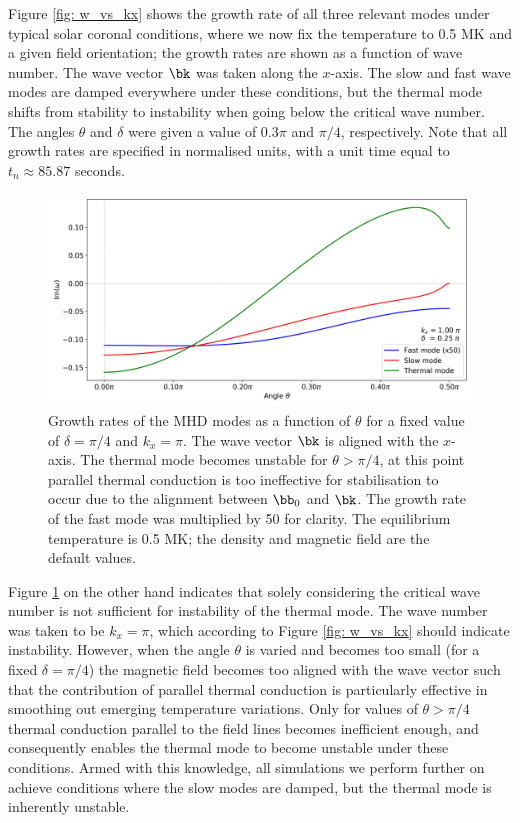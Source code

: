 Figure \ref{fig: w_vs_kx} shows the growth rate of all three relevant modes under typical solar coronal conditions, where we now fix the temperature to 0.5 MK and a given field orientation; the growth rates are shown as a function of wave number. The wave vector $\bk$ was taken along the $x$-axis. The slow and fast wave modes are damped everywhere under these conditions, but the thermal mode shifts from stability to instability when going below the critical wave number. The angles $\theta$ and $\delta$ were given a value of $0.3\pi$ and $\pi/4$, respectively. Note that all growth rates are specified in normalised units, with a unit time equal to $t_n \approx 85.87$ seconds.

\begin{figure}[t]
  \centering
  \includegraphics[width=\textwidth]{w_vs_theta.png}
  \caption{
    Growth rates of the MHD modes as a function of $\theta$ for a fixed value of $\delta = \pi/4$ and $k_x = \pi$. The wave vector $\bk$ is aligned with the $x$-axis. The thermal mode becomes unstable for $\theta > \pi/4$, at this point parallel thermal conduction is too ineffective for stabilisation to occur due to the alignment between $\bb_0$ and $\bk$. The growth rate of the fast mode was multiplied by 50 for clarity. The equilibrium temperature is 0.5 MK; the density and magnetic field are the default values.
  }
  \label{fig: w_vs_theta}
\end{figure}

Figure \ref{fig: w_vs_theta} on the other hand indicates that solely considering the critical wave number is not sufficient for instability of the thermal mode. The wave number was taken to be $k_x = \pi$, which according to Figure \ref{fig: w_vs_kx} should indicate instability. However, when the angle $\theta$ is varied and becomes too small (for a fixed $\delta = \pi/4$) the magnetic field becomes too aligned with the wave vector such that the contribution of parallel thermal conduction is particularly effective in smoothing out emerging temperature variations. Only for values of $\theta > \pi/4$ thermal conduction parallel to the field lines becomes inefficient enough, and consequently enables the thermal mode to become unstable under these conditions. Armed with this knowledge, all simulations we perform further on achieve conditions where the slow modes are damped, but the thermal mode is inherently unstable.



